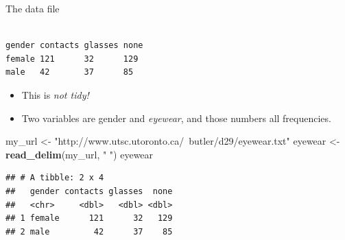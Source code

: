 \documentclass[ignorenonframetext,]{beamer}
\newenvironment{Shaded}{\begin{snugshade}}{\end{snugshade}}
\newcommand{\KeywordTok}[1]{\textcolor[rgb]{0.13,0.29,0.53}{\textbf{#1}}}
\newcommand{\NormalTok}[1]{#1}
\newcommand{\StringTok}[1]{\textcolor[rgb]{0.31,0.60,0.02}{#1}}
\begin{document}
\begin{frame}[fragile]{The data file}
\protect\hypertarget{the-data-file}{}

\begin{verbatim}

gender contacts glasses none
female 121      32      129
male   42       37      85
\end{verbatim}

\begin{itemize}
\item
  This is \emph{not tidy!}
\item
  Two variables are gender and \emph{eyewear}, and those numbers all
  frequencies.
\end{itemize}

\begin{Shaded}
\begin{Highlighting}[]
\NormalTok{my_url <-}\StringTok{ "http://www.utsc.utoronto.ca/~butler/d29/eyewear.txt"}
\NormalTok{eyewear <-}\StringTok{ }\KeywordTok{read_delim}\NormalTok{(my_url, }\StringTok{" "}\NormalTok{)}
\NormalTok{eyewear}
\end{Highlighting}
\end{Shaded}

\begin{verbatim}
## # A tibble: 2 x 4
##   gender contacts glasses  none
##   <chr>     <dbl>   <dbl> <dbl>
## 1 female      121      32   129
## 2 male         42      37    85
\end{verbatim}

\end{frame}
\end{document}
